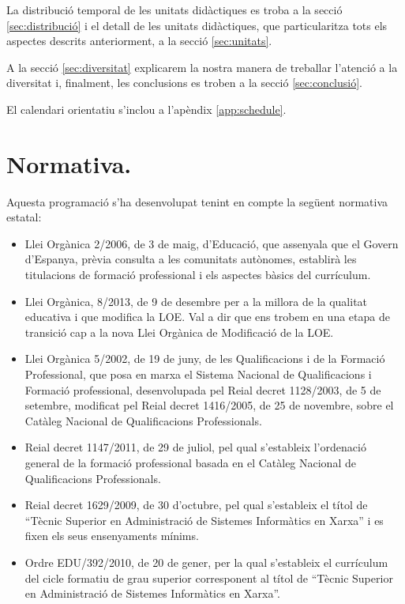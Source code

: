 \documentclass[catalan, a4paper, 12pt, titlepage]{article}
\begin{document}
La distribució temporal de les unitats didàctiques es troba a la secció \ref{sec:distribució} i el detall de les unitats didàctiques, que particularitza tots els aspectes descrits anteriorment, a la secció \ref{sec:unitats}.

A la secció \ref{sec:diversitat} explicarem la nostra manera de treballar l'atenció a la diversitat i, finalment, les conclusions es troben a la secció \ref{sec:conclusió}.

El calendari orientatiu s'inclou a l'apèndix \ref{app:schedule}.

\section{Normativa.}
\label{sec:normativa}

Aquesta programació s'ha desenvolupat tenint en compte la següent normativa estatal:
\begin{itemize}
	\item Llei Orgànica 2/2006, de 3 de maig, d'Educació, que assenyala que el Govern d'Espanya, prèvia consulta a les comunitats autònomes, establirà les titulacions de formació professional i els aspectes bàsics del currículum.
	\item Llei Orgànica, 8/2013, de 9 de desembre per a la millora de la qualitat educativa i que modifica la LOE. Val a dir que ens trobem en una etapa de transició cap a la nova Llei Orgànica de Modificació de la LOE.
	\item Llei Orgànica 5/2002, de 19 de juny, de les Qualificacions i de la Formació Professional, que posa en marxa el Sistema Nacional de Qualificacions i Formació professional, desenvolupada pel Reial decret 1128/2003, de 5 de setembre, modificat pel Reial decret 1416/2005, de 25 de novembre, sobre el Catàleg Nacional de Qualificacions Professionals.
	\item Reial decret 1147/2011, de 29 de juliol, pel qual s'estableix l'ordenació general de la formació professional basada en el Catàleg Nacional de Qualificacions Professionals.
	\item Reial decret 1629/2009, de 30 d'octubre, pel qual s'estableix el títol de ``Tècnic Superior en Administració de Sistemes Informàtics en Xarxa'' i es fixen els seus ensenyaments mínims.
	\item Ordre EDU/392/2010, de 20 de gener, per la qual s'estableix el currículum del cicle formatiu de grau superior corresponent al títol de ``Tècnic Superior en Administració de Sistemes Informàtics en Xarxa''.
\end{itemize}
\end{document}
